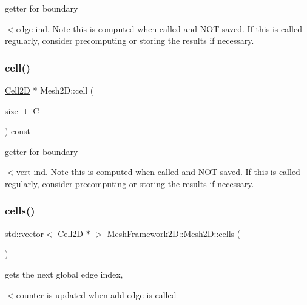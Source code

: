 getter for boundary 

$<$edge ind. Note this is computed when called and N\+OT saved. If this is called regularly, consider precomputing or storing the results if necessary. \mbox{\label{classMeshFramework2D_1_1Mesh2D_a1d8c40ea85f0abe3ae5aea23e4a95583}} 
\subsubsection{\texorpdfstring{cell()}{cell()}}
{\footnotesize\ttfamily \hyperlink{classMeshFramework2D_1_1Cell2D}{Cell2D} $\ast$ Mesh2\+D\+::cell (\begin{DoxyParamCaption}\item[{size\+\_\+t}]{iC }\end{DoxyParamCaption}) const}



getter for boundary 

$<$vert ind. Note this is computed when called and N\+OT saved. If this is called regularly, consider precomputing or storing the results if necessary. \mbox{\label{classMeshFramework2D_1_1Mesh2D_ae886af87d932c7584d2e75c0e73cb01e}} 
\subsubsection{\texorpdfstring{cells()}{cells()}}
{\footnotesize\ttfamily std\+::vector$<$ \hyperlink{classMeshFramework2D_1_1Cell2D}{Cell2D} $\ast$ $>$ Mesh\+Framework2\+D\+::\+Mesh2\+D\+::cells (\begin{DoxyParamCaption}{ }\end{DoxyParamCaption})\hspace{0.3cm}{\ttfamily [inline]}}



gets the next global edge index, 

$<$counter is updated when add edge is called \mbox{\label{classMeshFramework2D_1_1Mesh2D_a9dd54d7b118e6f645d9af819a7555e93}} 
